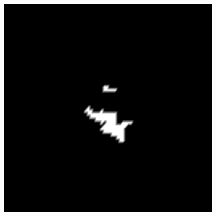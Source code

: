 \documentclass[a4paper,12pt,twoside]{article}%
\begin{document}
\begin{figure}[H]
    {\includegraphics[scale=0.21]{pics/cropT7_otsu.png}}
    \hspace{5px}

\end{figure}
\end{document}
